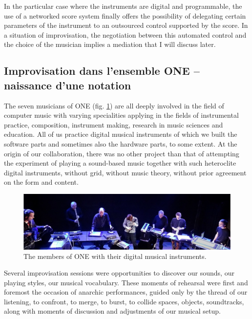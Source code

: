 In the particular case where the instruments are digital and programmable, the use of a networked score system finally offers the possibility of delegating certain parameters of the instrument to an outsourced control supported by the score. In a situation of improvisation, the negotiation between this automated control and the choice of the musician implies a mediation that I will discuss later.

\subsection{Improvisation dans l'ensemble ONE – naissance d'une notation}

The seven musicians of ONE (fig. \ref{fig:notation:one-fullband}) are all deeply involved in the field of computer music with varying specialities applying in the fields of instrumental practice, composition, instrument making, research in music sciences and education. All of us practice digital musical instruments of which we built the software parts and sometimes also the hardware parts, to some extent. At the origin of our collaboration, there was no other project than that of attempting the experiment of playing a sound-based music together with such heteroclite digital instruments, without grid, without music theory, without prior agreement on the form and content.

\begin{figure}[htb]
	\includegraphics[width=\textwidth]{gfx/notation/ONE-fullBand.png}
	\caption{The members of ONE with their digital musical instruments.}
	\label{fig:notation:one-fullband}
\end{figure}

Several improvisation sessions were opportunities to discover our sounds, our playing styles, our musical vocabulary. These moments of rehearsal were first and foremost the occasion of anarchic performances, guided only by the thread of our listening, to confront, to merge, to burst, to collide spaces, objects, soundtracks, along with moments of discussion and adjustments of our musical setup.

